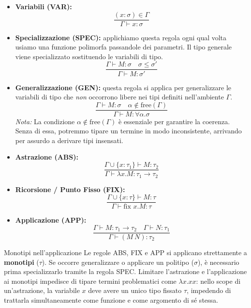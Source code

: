 \begin{itemize}
    \item \textbf{Variabili (VAR):} 
    $$ \frac{(x:\sigma)\in\Gamma}{\Gamma\vdash x:\sigma} $$
    
    \item \textbf{Specializzazione (SPEC):} applichiamo questa regola ogni qual volta usiamo una funzione polimorfa passandole dei parametri. 
    Il tipo generale viene specializzato sostituendo le variabili di tipo. 
    $$ \frac{\Gamma\vdash M:\sigma \quad \sigma\le\sigma'}{\Gamma\vdash M:\sigma'} $$ 
    
    \item \textbf{Generalizzazione (GEN):} questa regola si applica per generalizzare le variabili di tipo che \textit{non} occorrono libere nei tipi definiti nell'ambiente $\Gamma$. 
    $$ \frac{\Gamma\vdash M:\sigma \quad \alpha\notin \text{free}(\Gamma)}{\Gamma\vdash M:\forall\alpha.\sigma} $$ 
    \subitem \textit{Nota:} La condizione $\alpha\notin \text{free}(\Gamma)$ è essenziale per garantire la coerenza. 
    Senza di essa, potremmo tipare un termine in modo inconsistente, arrivando per assurdo a derivare tipi insensati. 

    \item \textbf{Astrazione (ABS):} 
    $$ \frac{\Gamma\cup\{x:\tau_1\}\vdash M:\tau_2}{\Gamma\vdash\lambda x.M:\tau_1\rightarrow\tau_2} $$
    
    \item \textbf{Ricorsione / Punto Fisso (FIX):} 
    $$ \frac{\Gamma\cup\{x:\tau\}\vdash M:\tau}{\Gamma\vdash \text{fix } x.M:\tau} $$

    \item \textbf{Applicazione (APP):} 
    $$ \frac{\Gamma\vdash M:\tau_1\rightarrow\tau_2 \quad \Gamma\vdash N:\tau_1}{\Gamma\vdash (M \ N):\tau_2} $$
\end{itemize}

\begin{gframe}{Monotipi nell'applicazione}
    Le regole ABS, FIX e APP si applicano strettamente a \textbf{monotipi} ($\tau$). 
    Se occorre generalizzare o applicare un politipo ($\sigma$), è necessario prima specializzarlo tramite la regola SPEC. 
    Limitare l'astrazione e l'applicazione ai monotipi impedisce di tipare termini problematici come $\lambda x.xx$: nello scope di un'astrazione, la variabile $x$ deve avere un unico tipo fissato $\tau$, impedendo di trattarla simultaneamente come funzione e come argomento di sé stessa. 
\end{gframe}

